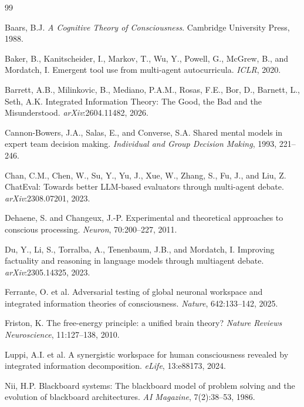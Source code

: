 \documentclass[11pt]{article}
\theoremstyle{definition}
\begin{document}

\begin{thebibliography}{99}

Baars, B.J. \textit{A Cognitive Theory of Consciousness}. Cambridge University Press, 1988.

Baker, B., Kanitscheider, I., Markov, T., Wu, Y., Powell, G., McGrew, B., and Mordatch, I.
Emergent tool use from multi-agent autocurricula. \textit{ICLR}, 2020.

Barrett, A.B., Milinkovic, B., Mediano, P.A.M., Rosas, F.E., Bor, D., Barnett, L., Seth, A.K.
Integrated Information Theory: The Good, the Bad and the Misunderstood.
\textit{arXiv}:2604.11482, 2026.

Cannon-Bowers, J.A., Salas, E., and Converse, S.A. Shared mental models in expert team
decision making. \textit{Individual and Group Decision Making}, 1993, 221--246.

Chan, C.M., Chen, W., Su, Y., Yu, J., Xue, W., Zhang, S., Fu, J., and Liu, Z.
ChatEval: Towards better LLM-based evaluators through multi-agent debate.
\textit{arXiv}:2308.07201, 2023.

Dehaene, S. and Changeux, J.-P. Experimental and theoretical approaches to conscious
processing. \textit{Neuron}, 70:200--227, 2011.

Du, Y., Li, S., Torralba, A., Tenenbaum, J.B., and Mordatch, I.
Improving factuality and reasoning in language models through multiagent debate.
\textit{arXiv}:2305.14325, 2023.

Ferrante, O. et al. Adversarial testing of global neuronal workspace and integrated
information theories of consciousness. \textit{Nature}, 642:133--142, 2025.

Friston, K. The free-energy principle: a unified brain theory? \textit{Nature Reviews
Neuroscience}, 11:127--138, 2010.

Luppi, A.I. et al. A synergistic workspace for human consciousness revealed by integrated
information decomposition. \textit{eLife}, 13:e88173, 2024.

Nii, H.P. Blackboard systems: The blackboard model of problem solving and the evolution
of blackboard architectures. \textit{AI Magazine}, 7(2):38--53, 1986.


\end{thebibliography}
\end{document}
